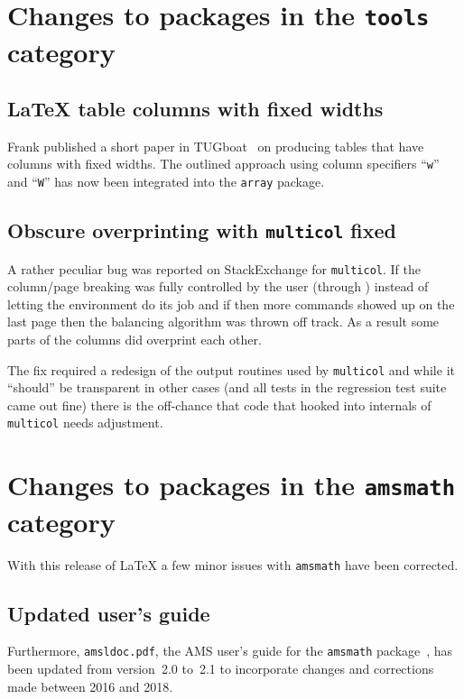 \documentclass{ltnews}
\providecommand\pkg[1]{\texttt{#1}}
\providecommand\file[1]{\texttt{#1}}
\begin{document}
\section{Changes to packages in the \pkg{tools} category}

\subsection{\LaTeX{} table columns with fixed widths}

Frank published a short paper in
TUGboat~\cite{Mittelbach:TB38-2-213} on producing tables that have
columns with fixed widths. The outlined approach using column
specifiers ``\texttt{w}'' and ``\texttt{W}'' has now been integrated
into the \pkg{array} package.

\subsection{Obscure overprinting with \pkg{multicol} fixed}

A rather peculiar bug was reported on StackExchange for
\pkg{multicol}. If the column/page breaking was fully controlled by
the user (through ) instead of letting the environment
do its job and if then more  commands showed up on the
last page then the balancing algorithm was thrown off track.
As a result some parts of the columns did overprint each other.

The fix required a redesign of the output routines used by
\pkg{multicol} and while it ``should'' be transparent in other cases
(and all tests in the regression test suite came out fine) there is the
off-chance that code that hooked into internals of \pkg{multicol}
needs adjustment.


\section{Changes to packages in the \pkg{amsmath} category}

With this release of \LaTeX{} a few minor issues with \pkg{amsmath}
have been corrected.

\subsection{Updated user's guide}

Furthermore, \file{amsldoc.pdf}, the AMS user's
guide for the \pkg{amsmath} package~\cite{amsldoc}, has been updated
from version~2.0 to~2.1 to incorporate changes and corrections made
between 2016 and 2018.
\end{document}
